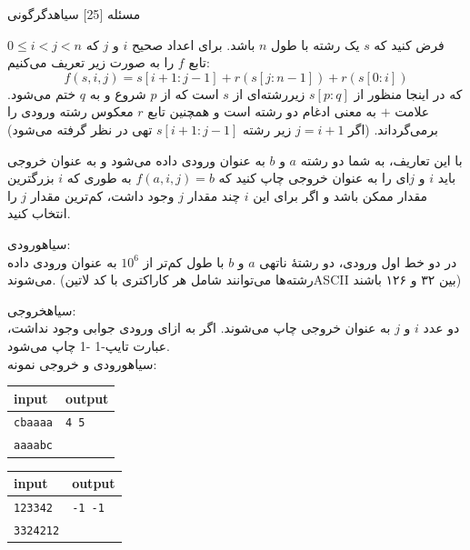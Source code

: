 ‌مسئله [25]
‌سیاه{دگرگونی}

فرض کنید که $s$ یک رشته با طول $n$ باشد. برای اعداد صحیح $i$ و $j$ که 
$0 \leq i < j < n$
تابع $f$ را به صورت زیر تعریف می‌کنیم:
$$f(s, i, j) = s[i+1:j-1] + r(s[j:n-1]) + r(s[0:i]) $$
که در اینجا منظور از 
$s[p:q]$
زیررشته‌ای از $s$ است که از $p$ شروع و به $q$ ختم می‌شود. علامت $+$ به معنی ادغام دو رشته است و همچنین تابع $r$ معکوس رشته ورودی را برمی‌گرداند. (اگر 
$j=i+1$
زیر رشته 
$s[i+1:j-1]$
تهی در نظر گرفته می‌شود)

با این تعاریف، به شما دو رشته $a$ و $b$ به عنوان ورودی داده می‌شود و به عنوان خروجی باید $i$ و $j$ای را به عنوان خروجی چاپ کنید که  
$f(a, i, j) = b$
به طوری که ‌$i$ بزرگترین مقدار ممکن باشد و اگر برای این $i$ چند مقدار $j$ وجود داشت، کم‌ترین 
مقدار $j$ را انتخاب کنید.

‌سیاه{ورودی:}\\
در دو خط اول ورودی، دو رشتۀ ناتهی $a$ و $b$ با طول کم‌تر از $10^6$ به عنوان ورودی داده می‌شوند. (رشته‌ها می‌توانند شامل هر کاراکتری با کد ‌لاتین{ASCII} بین ۳۲ و ۱۲۶ باشند) 

‌سیاه{خروجی:}\\
دو عدد $i$ و $j$ به عنوان خروجی چاپ می‌شوند. اگر به ازای ورودی جوابی وجود نداشت، عبارت 
‌تایپ{-1 -1}
چاپ می‌شود.\\

‌سیاه{ورودی و خروجی نمونه:}\\
\begin{latin}
	\begin{tabularx}{\textwidth}{|X | X|}
		\hline
		\textbf{input} &
		\textbf{output}\\
		\hline
		\texttt{cbaaaa}
		&
		\texttt{4 5}\\
		\texttt{aaaabc}&\\
		\hline
		
	\end{tabularx}
\end{latin}

\begin{latin}
	\begin{tabularx}{\textwidth}{|X | X|}
		\hline
		\textbf{input} &
		\textbf{output}\\
		\hline
		\texttt{123342}
		&
		\texttt{-1 -1}\\
		\texttt{3324212}&\\
		\hline
		
	\end{tabularx}
\end{latin}


